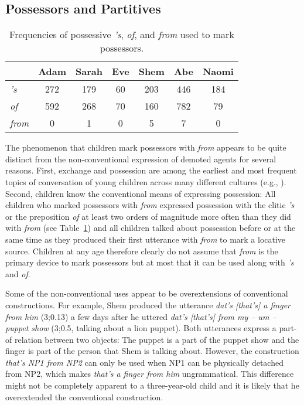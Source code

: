 \documentclass[lucida]{sp} %
\begin{document}
\subsection{Possessors and Partitives}

\begin{table}
\hspace{0.125\textwidth}\begin{tabularx}{0.75\textwidth}{l | c | c | c | c | c | c }
& Adam & Sarah &  Eve   & Shem & Abe  & Naomi  \\ \midrule
\textit{'s} & 272 &   179 & 60 &   203 & 446 &  184 \\
\textit{of} & 592 & 268 & 70 & 160 & 782 & 79 \\
\textit{from} & 0 & 1 & 0 & 5 & 7 & 0 \\
\end{tabularx}
\caption{Frequencies of possessive \textit{'s}, \textit{of}, and \textit{from} used to mark possessors.}\label{tbl:poss}
\end{table}


The phenomenon that children mark possessors with \textit{from} appears to be quite distinct from the non-conventional expression of demoted agents for several reasons. First, exchange and possession are among the earliest and most frequent topics of conversation of young children across many different cultures (e.g., \cite{stern1928,brown1973,tomasello1998}). Second, children know the conventional means of expressing possession: All children who marked possessors with \textit{from} expressed possession with the clitic \textit{'s} or the preposition \textit{of} at least two orders of magnitude more often than they did with \textit{from} (see Table~\ref{tbl:poss}) and all children talked about possession before or at the same time as they produced their first utterance with \textit{from} to mark a locative source. Children at any age therefore clearly do not assume that \textit{from} is the primary device to mark possessors but at most that it can be used along with \textit{'s} and \textit{of}. 

Some of the non-conventional uses appear to be overextensions of conventional constructions. For example, Shem produced the utterance \textit{dat's [that's] a finger from him} (3;0.13) a few days after he uttered \textit{dat's [that's] from my -- um -- puppet show} (3;0.5, talking about a lion puppet). Both utterances express a part-of relation between two objects: The puppet is a part of the puppet show  and the finger is part of the person that Shem is talking about. However, the construction \textit{that's NP1 from NP2} can only be used when NP1 can be physically detached from NP2, which makes \textit{that's a finger from him} ungrammatical. This difference might not be completely apparent to a three-year-old child and it is likely that he overextended the conventional construction.
\end{document}
